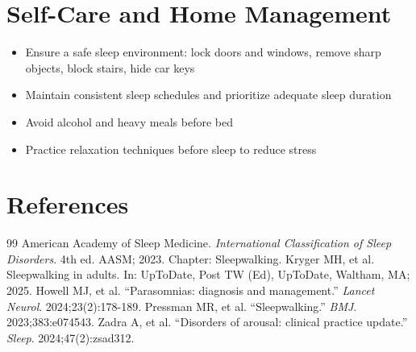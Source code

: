 \section*{Self-Care and Home Management}
\begin{itemize}
  \item Ensure a safe sleep environment: lock doors and windows, remove sharp objects, block stairs, hide car keys
  \item Maintain consistent sleep schedules and prioritize adequate sleep duration
  \item Avoid alcohol and heavy meals before bed
  \item Practice relaxation techniques before sleep to reduce stress
\end{itemize}

\section*{References}
\begin{thebibliography}{99}
 American Academy of Sleep Medicine. \emph{International Classification of Sleep Disorders}. 4th ed. AASM; 2023. Chapter: Sleepwalking.
 Kryger MH, et al. Sleepwalking in adults. In: UpToDate, Post TW (Ed), UpToDate, Waltham, MA; 2025.
 Howell MJ, et al. ``Parasomnias: diagnosis and management.'' \emph{Lancet Neurol}. 2024;23(2):178-189.
 Pressman MR, et al. ``Sleepwalking.'' \emph{BMJ}. 2023;383:e074543.
 Zadra A, et al. ``Disorders of arousal: clinical practice update.'' \emph{Sleep}. 2024;47(2):zsad312.
\end{thebibliography}
